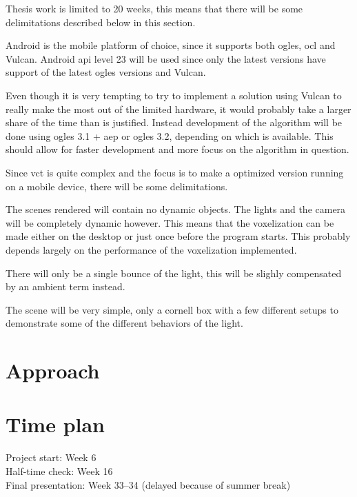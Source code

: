 \documentclass[a4paper, 12pt]{article}
\begin{document}
Thesis work is limited to 20 weeks, this means that there will be some delimitations described below in this section.

Android is the mobile platform of choice, since it supports both \gls{ogles}, \gls{ocl} and Vulcan. Android \acrshort{api} level 23 will be used since only the latest versions have support of the latest \gls{ogles} versions and Vulcan.

Even though it is very tempting to try to implement a solution using Vulcan to really make the most out of the limited hardware, it would probably take a larger share of the time than is justified. Instead development of the algorithm will be done using \gls{ogles} 3.1 + \gls{aep} or \gls{ogles} 3.2, depending on which is available. This should allow for faster development and more focus on the algorithm in question.


Since vct is quite complex and the focus is to make a optimized version running on a mobile device, there will be some delimitations.

The scenes rendered will contain no dynamic objects. The lights and the camera will be completely dynamic however. This means that the voxelization can be made either on the desktop or just once before the program starts. This probably depends largely on the performance of the voxelization implemented.

There will only be a single bounce of the light, this will be slighly compensated by an ambient term instead.

The scene will be very simple, only a cornell box with a few different setups to demonstrate some of the different behaviors of the light.
\nocite{*}
\printbibliography[heading=bibintoc, title={Litterature Base}, subtype=litbase, prefixnumbers={LB}]

\section{Approach}
\label{sec:Approach}


\section{Time plan}
\label{sec:Time plan}

Project start: Week 6 \\
Half-time check: Week 16 \\
Final presentation: Week 33--34 (delayed because of summer break)
\end{document}
